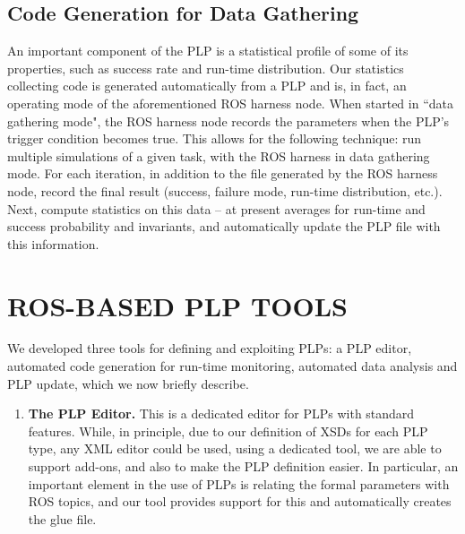 \documentclass[letterpaper]{article}
\begin{document}
{%


\subsection{Code Generation for Data Gathering}
An important component of the PLP is a statistical profile of some of its properties, such as success rate and run-time distribution.
 Our statistics collecting code is generated automatically from a PLP and is, in fact,
an operating mode of the aforementioned ROS harness node. When started in ``data gathering mode", the ROS harness node records the parameters when the PLP's trigger condition becomes true. This allows for the following technique: run multiple simulations of a given task, with the ROS harness in data gathering mode. For each iteration, in addition to the file generated by the ROS harness node, record the final result (success, failure mode, run-time distribution, etc.). Next, compute statistics on this data -- at present averages for run-time and success probability and invariants, and automatically update the PLP file with this information.


\section{ROS-BASED PLP TOOLS}
We developed three tools for defining and exploiting PLPs:
a PLP editor, automated code generation for run-time monitoring,
automated data analysis and PLP update, which we now briefly describe.
\begin{enumerate}
\item {\bf The PLP Editor.}
This is a dedicated editor for PLPs with standard features. While, in principle, due to our definition of XSDs for each PLP type, any XML editor could be used, using a dedicated tool, we are able to support  add-ons, and also to make the PLP definition easier. In particular, an important element in the use of PLPs is relating the formal parameters with ROS topics, and our tool provides support for this and automatically creates the glue file.


\end{enumerate}}
\end{document}
